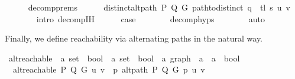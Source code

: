 \begin{isabellebody}
\ \ \ \ \isamarkupfalse%
\ decomp{\isachardot}{\kern0pt}prems{\isacharparenleft}{\kern0pt}{}{\isacharparenright}{\kern0pt}\isanewline
\ \ \ \ \isamarkupfalse%
\ {\isachardoublequoteopen}distinct{\isacharunderscore}{\kern0pt}alt{\isacharunderscore}{\kern0pt}path\ P\ Q\ G\ {\isacharparenleft}{\kern0pt}path{\isacharunderscore}{\kern0pt}to{\isacharunderscore}{\kern0pt}distinct\ {\isacharparenleft}{\kern0pt}q\ {\isacharat}{\kern0pt}\ tl\ s{\isacharparenright}{\kern0pt}{\isacharparenright}{\kern0pt}\ u\ v{\isachardoublequoteclose}\isanewline
\ \ \ \ \ \ \isamarkupfalse%
\ {\isacharparenleft}{\kern0pt}intro\ decomp{\isachardot}{\kern0pt}IH{\isacharparenright}{\kern0pt}\isanewline
\ \ \ \ \isamarkupfalse%
\ {\isacharquery}{\kern0pt}case\isanewline
\ \ \ \ \ \ \isamarkupfalse%
\ decomp{\isachardot}{\kern0pt}hyps\isanewline
\ \ \ \ \ \ \isamarkupfalse%
\ auto\isanewline
\ \ \isamarkupfalse%
\isanewline
{}\isamarkupfalse%
%
\endisatagproof
{\isafoldproof}%
%
\isadelimproof
%
\endisadelimproof
%
\begin{isamarkuptext}%
Finally, we define reachability via alternating paths in the natural way.%
\end{isamarkuptext}\isamarkuptrue%
\isamarkupfalse%
\ alt{\isacharunderscore}{\kern0pt}reachable\ {\isacharcolon}{\kern0pt}{\isacharcolon}{\kern0pt}\ {\isachardoublequoteopen}{\isacharparenleft}{\kern0pt}{\isacharprime}{\kern0pt}a\ set\ {\isasymRightarrow}\ bool{\isacharparenright}{\kern0pt}\ {\isasymRightarrow}\ {\isacharparenleft}{\kern0pt}{\isacharprime}{\kern0pt}a\ set\ {\isasymRightarrow}\ bool{\isacharparenright}{\kern0pt}\ {\isasymRightarrow}\ {\isacharprime}{\kern0pt}a\ graph\ {\isasymRightarrow}\ {\isacharprime}{\kern0pt}a\ {\isasymRightarrow}\ {\isacharprime}{\kern0pt}a\ {\isasymRightarrow}\ bool{\isachardoublequoteclose}\ \isanewline
\ \ {\isachardoublequoteopen}alt{\isacharunderscore}{\kern0pt}reachable\ P\ Q\ G\ u\ v\ {\isasymequiv}\ {\isasymexists}p{\isachardot}{\kern0pt}\ alt{\isacharunderscore}{\kern0pt}path\ P\ Q\ G\ p\ u\ v{\isachardoublequoteclose}\isanewline
%
\isadelimtheory
\isanewline
%
\endisadelimtheory
%
\isatagtheory
{}\isamarkupfalse%
%
\endisatagtheory
{\isafoldtheory}%
%
\isadelimtheory
%
\endisadelimtheory
%
\end{isabellebody}%
\endinput
